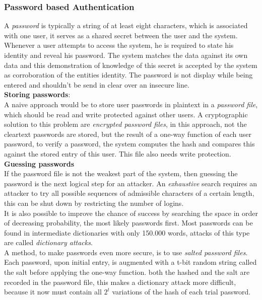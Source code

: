 \documentclass[a4paper, 10 pt, conference]{ieeeconf}
\begin{document}
\subsubsection{\textbf{Password based Authentication}}
A \emph{password} is typically a string of at least eight characters, which is associated with one user, it serves as a shared secret between the user and the system. 
Whenever a user attempts to access the system, he is required to state his identity and reveal his password. The system matches the data against its own data and this demonstration of  knowledge of this secret is accepted by the system as corroboration of the entities identity.
The password is not display while being entered and shouldn't be send in clear over an insecure line. \\
\textbf{Storing passwords}: \\
A naive approach would be to store user passwords in plaintext in a \emph{password file}, which should be read and write protected against other users.
A cryptographic solution to this problem are \emph{encrypted password files}, in this approach, not the cleartext passwords are stored, but the result of a one-way function of each user password, to verify a password, the system computes the hash and compares this against the stored entry of this user. 
This file also needs write protection. \\
\textbf{Guessing passwords} \\
If the password file is not the weakest part of the system, then guessing the password is the next logical step for an attacker. An \emph{exhaustive} search requires an attacker to try all possible sequences of admissible characters of a certain length, this can be shut down by restricting the number of logins. \\
It is also possible to improve the chance of success by searching the space in order of decreasing probability, the most likely passwords first. Most passwords can be found in intermediate dictionaries with only 150.000 words, attacks of this type are called \emph{dictionary attacks}. \\
A method, to make passwords even more secure, is to use \emph{salted password files}. Each password, upon initial entry, is augmented with a t-bit random string called the salt before applying the one-way function. both the hashed and the salt are recorded in the password file, this makes a dictionary attack more difficult, because it now must contain all $2^t$ variations of the hash of each trial password. \\
\end{document}
